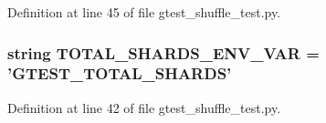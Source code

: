 \-Definition at line 45 of file gtest\-\_\-shuffle\-\_\-test.\-py.

\hypertarget{namespacegtest__shuffle__test_a29eb92c501c01a11bd57180093e5548f}{
\subsubsection[{\-T\-O\-T\-A\-L\-\_\-\-S\-H\-A\-R\-D\-S\-\_\-\-E\-N\-V\-\_\-\-V\-A\-R}]{\setlength{\rightskip}{0pt plus 5cm}string {\bf \-T\-O\-T\-A\-L\-\_\-\-S\-H\-A\-R\-D\-S\-\_\-\-E\-N\-V\-\_\-\-V\-A\-R} = '\-G\-T\-E\-S\-T\-\_\-\-T\-O\-T\-A\-L\-\_\-\-S\-H\-A\-R\-D\-S'}}\label{d3/d15/namespacegtest__shuffle__test_a29eb92c501c01a11bd57180093e5548f}


\-Definition at line 42 of file gtest\-\_\-shuffle\-\_\-test.\-py.

